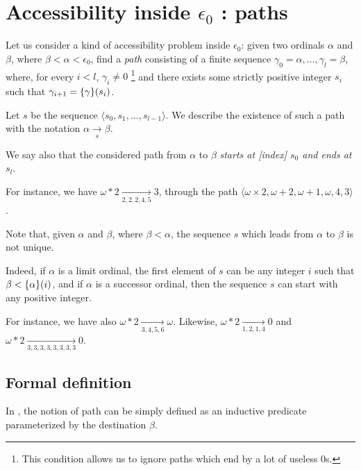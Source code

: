 \section{Accessibility inside \texorpdfstring{$\epsilon_0$}{epsilon0} : paths}
\label{sect:pathes-intro}

Let us consider a kind of accessibility problem inside $\epsilon_0$: given two ordinals $\alpha$ and $\beta$, where $\beta<\alpha<\epsilon_0$, find a \emph{path} consisting of a finite sequence $\gamma_0=\alpha,\dots,\gamma_l=\beta$,
where, for every $i<l$, $\gamma_i \not= 0$ \footnote{This condition allows us to ignore paths which end by a lot of useless $0$s.} and there exists some strictly positive integer $s_i$
such that $\gamma_{i+1}=\mbox{$\{\gamma\}(s_i)$}$.

Let $s$ be the sequence $\langle s_0,s_1,\dots, s_{l-1} \rangle$. We describe the
existence of such a path with the notation $\alpha\xrightarrow [s]{}\beta$.

We say also that the considered path from $\alpha$ to $\beta$ \emph{starts at [index] $s_0$ and ends at $s_l$}.

For instance, we have $\omega*2 \xrightarrow[2,2,2,4,5]{}3$, through the 
path $\langle\omega\times 2, \omega+2,\omega+1,\omega,4,3\rangle$.


\begin{remark}
  

Note that, given $\alpha$ and $\beta$, where $\beta < \alpha$, the sequence $s$ which leads from $\alpha$ to $\beta$ is not unique.

Indeed, if $\alpha$ is a limit ordinal, the first element of $s$ can be any integer $i$ such that $\beta<\mbox{$\{\alpha\}(i)$}$, and if $\alpha$ is a successor ordinal,
then the sequence $s$ can start with any positive integer.


For instance, we have also 
$\omega*2 \xrightarrow[3,4,5,6]{}\omega$. 
Likewise,
$\omega*2 \xrightarrow[1,2,1,4]{} 0$ and
$\omega*2 \xrightarrow[3,3,3,3,3,3,3,3]{} 0$.
\end{remark}

\subsection{Formal definition}

\label{path-to-definition}

In \coq{}, the notion of path can be simply defined as an inductive predicate 
parameterized by the destination $\beta$.

